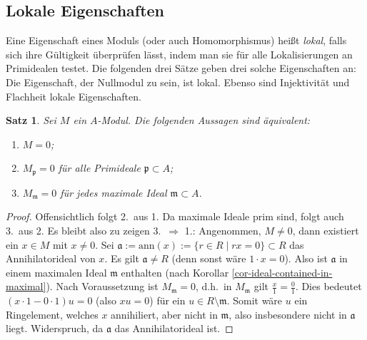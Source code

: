 \documentclass[reqno,12pt]{article}
\numberwithin{equation}{section}
\theoremstyle{plain}
\newtheorem{proposition}[thm]{Satz}
\theoremstyle{definition}
\begin{document}
\subsection{Lokale Eigenschaften}

Eine Eigenschaft eines Moduls (oder auch Homomorphismus) heißt \emph{lokal}, falls sich ihre Gültigkeit überprüfen lässt, indem man sie für alle Lokalisierungen an Primidealen testet. Die folgenden drei Sätze geben drei solche Eigenschaften an: Die Eigenschaft, der Nullmodul zu sein, ist lokal. Ebenso sind Injektivität und Flachheit lokale Eigenschaften.

\begin{proposition}\label{satz-being-zero-is-local}
Sei $M$ ein $A$-Modul. Die folgenden Aussagen sind äquivalent:
\begin{enumerate}
	\item $M=0$;
	\item $M_\mathfrak{p}=0$ für alle Primideale $\mathfrak{p}\subset A$;
	\item $M_\mathfrak{m}=0$ für jedes maximale Ideal $\mathfrak{m}\subset A$.
\end{enumerate}
\end{proposition}
\begin{proof}
Offensichtlich folgt 2.\ aus 1. Da maximale Ideale prim sind, folgt auch 3.\ aus 2. Es bleibt also zu zeigen 3.\ $\Rightarrow$ 1.:
Angenommen, $M\neq 0$, dann existiert ein $x\in M$ mit $x\neq 0$. Sei $\mathfrak{a}:=\mathrm{ann}(x):= \{r\in R\mid rx=0\}\subset R$ das Annihilatorideal von $x$. Es gilt $ \mathfrak{a}\neq R$ (denn sonst wäre $1\cdot x=0$). Also ist $\mathfrak{a}$ in einem maximalen Ideal $\mathfrak{m}$ enthalten (nach Korollar \ref{cor-ideal-contained-in-maximal}).
Nach Voraussetzung ist $M_\mathfrak{m}=0$, d.h.\ in $M_\mathfrak{m}$ gilt $\frac{x}{1}=\frac{0}{1}$. Dies bedeutet $(x\cdot 1 - 0\cdot 1)u=0$ (also $xu=0$) für ein $u\in R\setminus \mathfrak{m}$. Somit wäre $u$ ein Ringelement, welches $x$ annihiliert, aber nicht in $\mathfrak{m}$, also insbesondere nicht in $\mathfrak{a}$ liegt. Widerspruch, da $\mathfrak{a}$ das Annihilatorideal ist.
\end{proof}
\end{document}
